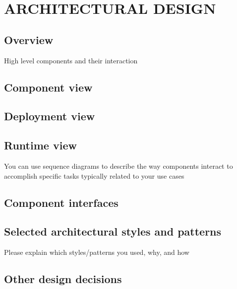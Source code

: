 \section{ARCHITECTURAL DESIGN }
\subsection{Overview}
High level components and their interaction
\subsection{Component view} 
\subsection{Deployment view} 
\subsection{Runtime  view}  
You  can  use  sequence  diagrams  to  describe  the  way  components interact to accomplish specific tasks typically related to your use cases 
\subsection{Component interfaces} 
\subsection{Selected  architectural  styles  and  patterns}
Please  explain  which  styles/patterns  you used, why, and how    
\subsection{Other design decisions} 